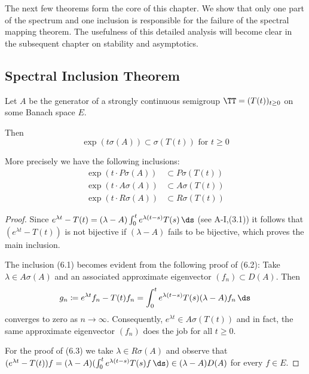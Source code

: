 The next few theorems form the core of this chapter. We show that only one part of the spectrum and one inclusion is responsible for the failure of the spectral mapping theorem.
The usefulness of this detailed analysis will become clear in the subsequent chapter on stability and asymptotics.

\subsection{Spectral Inclusion Theorem}\label{subsec:a3-6.2}
Let $A$ be the generator of a strongly continuous semigroup $\TT = (T(t))_{t \geq 0}$ on some Banach space $E$.

Then
\[
\exp(t\sigma(A)) \subset \sigma(T(t)) \text{ for } t \geq 0
\]

More precisely we have the following inclusions:
\begin{align}
\exp(t \cdot P\sigma(A)) &\subset P\sigma(T(t)) \label{eq:a3-6.1} \\
\exp(t \cdot A\sigma(A)) &\subset A\sigma(T(t)) \label{eq:a3-6.2} \\
\exp(t \cdot R\sigma(A)) &\subset R\sigma(T(t)) \label{eq:a3-6.3}
\end{align}
\begin{proof}
Since $e^{\lambda t} - T(t) = (\lambda - A)\int_{0}^{t} e^{\lambda(t-s)}T(s) \, \ds$ (see A-I,(3.1)) it follows that $(e^{\lambda t} - T(t))$ is not bijective if $(\lambda - A)$ fails to be bijective, which proves the main inclusion.

The inclusion (6.1) becomes evident from the following proof of (6.2): Take $\lambda \in A\sigma(A)$ and an associated approximate eigenvector $(f_{n}) \subset D(A)$.
Then
\[
g_{n} \coloneqq e^{\lambda t}f_{n} - T(t)f_{n} = \int_{0}^{t} e^{\lambda(t-s)}T(s)(\lambda-A)f_{n} \, \ds
\]
converges to zero as $n \to \infty$.
Consequently, $e^{\lambda t} \in A\sigma(T(t))$ and in fact, the same approximate eigenvector $(f_{n})$ does the job for all $t \geq 0$.

For the proof of (6.3) we take $\lambda \in R\sigma(A)$ and observe that $(e^{\lambda t} - T(t))f = (\lambda - A)(\int_{0}^{t} e^{\lambda(t-s)}T(s)f \, \ds) \in (\lambda - A)D(A)$ for every $f \in E$.
\end{proof}


